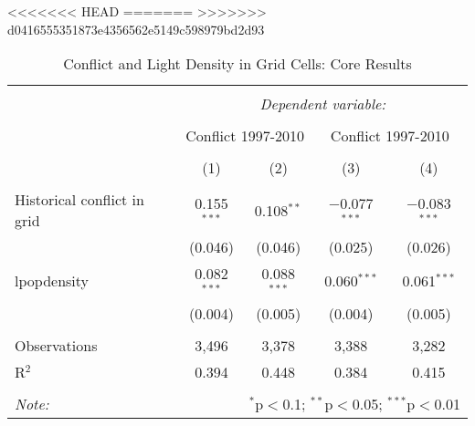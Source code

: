 
<<<<<<< HEAD
=======
>>>>>>> d0416555351873e4356562e5149c598979bd2d93
\begin{table}[!htbp] \centering 
  \caption{Conflict and Light Density in Grid Cells: Core Results} 
  \label{} 
\footnotesize 
\begin{tabular}{@{\extracolsep{2pt}}lcccc} 
\\[-1.8ex]\hline 
\hline \\[-1.8ex] 
 & \multicolumn{4}{c}{\textit{Dependent variable:}} \\ 
\cline{2-5} 
\\[-1.8ex] & \multicolumn{2}{c}{Conflict 1997-2010} & \multicolumn{2}{c}{Conflict 1997-2010} \\ 
\\[-1.8ex] & (1) & (2) & (3) & (4)\\ 
\hline \\[-1.8ex] 
 Historical conflict in grid & 0.155$^{***}$ & 0.108$^{**}$ & $-$0.077$^{***}$ & $-$0.083$^{***}$ \\ 
  & (0.046) & (0.046) & (0.025) & (0.026) \\ 
  lpopdensity & 0.082$^{***}$ & 0.088$^{***}$ & 0.060$^{***}$ & 0.061$^{***}$ \\ 
  & (0.004) & (0.005) & (0.004) & (0.005) \\ 
 \hline \\[-1.8ex] 
Observations & 3,496 & 3,378 & 3,388 & 3,282 \\ 
R$^{2}$ & 0.394 & 0.448 & 0.384 & 0.415 \\ 
\hline 
\hline \\[-1.8ex] 
\textit{Note:}  & \multicolumn{4}{r}{$^{*}$p$<$0.1; $^{**}$p$<$0.05; $^{***}$p$<$0.01} \\ 
\end{tabular} 
\end{table} 
